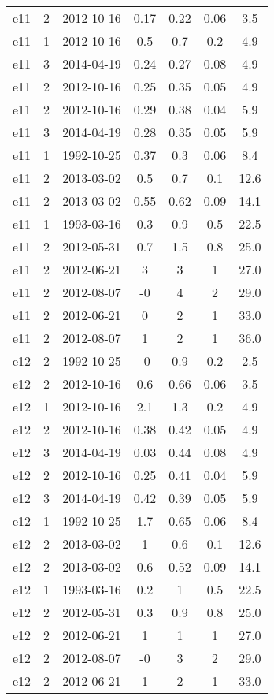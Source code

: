 \begin{table*}[htp]
\begin{tabular}{ccccccc}
e11 & 2 & 2012-10-16 & 0.17 & 0.22 & 0.06 & 3.5 \\
e11 & 1 & 2012-10-16 & 0.5 & 0.7 & 0.2 & 4.9 \\
e11 & 3 & 2014-04-19 & 0.24 & 0.27 & 0.08 & 4.9 \\
e11 & 2 & 2012-10-16 & 0.25 & 0.35 & 0.05 & 4.9 \\
e11 & 2 & 2012-10-16 & 0.29 & 0.38 & 0.04 & 5.9 \\
e11 & 3 & 2014-04-19 & 0.28 & 0.35 & 0.05 & 5.9 \\
e11 & 1 & 1992-10-25 & 0.37 & 0.3 & 0.06 & 8.4 \\
e11 & 2 & 2013-03-02 & 0.5 & 0.7 & 0.1 & 12.6 \\
e11 & 2 & 2013-03-02 & 0.55 & 0.62 & 0.09 & 14.1 \\
e11 & 1 & 1993-03-16 & 0.3 & 0.9 & 0.5 & 22.5 \\
e11 & 2 & 2012-05-31 & 0.7 & 1.5 & 0.8 & 25.0 \\
e11 & 2 & 2012-06-21 & 3 & 3 & 1 & 27.0 \\
e11 & 2 & 2012-08-07 & -0 & 4 & 2 & 29.0 \\
e11 & 2 & 2012-06-21 & 0 & 2 & 1 & 33.0 \\
e11 & 2 & 2012-08-07 & 1 & 2 & 1 & 36.0 \\
e12 & 2 & 1992-10-25 & -0 & 0.9 & 0.2 & 2.5 \\
e12 & 2 & 2012-10-16 & 0.6 & 0.66 & 0.06 & 3.5 \\
e12 & 1 & 2012-10-16 & 2.1 & 1.3 & 0.2 & 4.9 \\
e12 & 2 & 2012-10-16 & 0.38 & 0.42 & 0.05 & 4.9 \\
e12 & 3 & 2014-04-19 & 0.03 & 0.44 & 0.08 & 4.9 \\
e12 & 2 & 2012-10-16 & 0.25 & 0.41 & 0.04 & 5.9 \\
e12 & 3 & 2014-04-19 & 0.42 & 0.39 & 0.05 & 5.9 \\
e12 & 1 & 1992-10-25 & 1.7 & 0.65 & 0.06 & 8.4 \\
e12 & 2 & 2013-03-02 & 1 & 0.6 & 0.1 & 12.6 \\
e12 & 2 & 2013-03-02 & 0.6 & 0.52 & 0.09 & 14.1 \\
e12 & 1 & 1993-03-16 & 0.2 & 1 & 0.5 & 22.5 \\
e12 & 2 & 2012-05-31 & 0.3 & 0.9 & 0.8 & 25.0 \\
e12 & 2 & 2012-06-21 & 1 & 1 & 1 & 27.0 \\
e12 & 2 & 2012-08-07 & -0 & 3 & 2 & 29.0 \\
e12 & 2 & 2012-06-21 & 1 & 2 & 1 & 33.0 \\

\end{tabular}
\end{table*}
